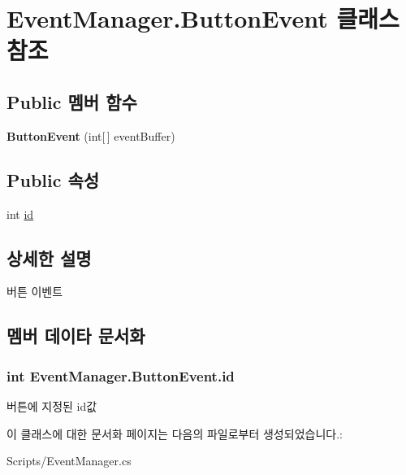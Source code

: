 \hypertarget{class_event_manager_1_1_button_event}{}\section{Event\+Manager.\+Button\+Event 클래스 참조}
\label{class_event_manager_1_1_button_event}
\subsection*{Public 멤버 함수}
\begin{DoxyCompactItemize}
\item 
\hypertarget{class_event_manager_1_1_button_event_a561644b31749f8f934620e88758335f6}{}{\bfseries Button\+Event} (int\mbox{[}$\,$\mbox{]} event\+Buffer)\label{class_event_manager_1_1_button_event_a561644b31749f8f934620e88758335f6}

\end{DoxyCompactItemize}
\subsection*{Public 속성}
\begin{DoxyCompactItemize}
\item 
int \hyperlink{class_event_manager_1_1_button_event_a1f2370e652753ea15df364cd3df7df2e}{id}
\end{DoxyCompactItemize}


\subsection{상세한 설명}
버튼 이벤트 

\subsection{멤버 데이타 문서화}
\hypertarget{class_event_manager_1_1_button_event_a1f2370e652753ea15df364cd3df7df2e}{}
\subsubsection[{id}]{\setlength{\rightskip}{0pt plus 5cm}int Event\+Manager.\+Button\+Event.\+id}\label{class_event_manager_1_1_button_event_a1f2370e652753ea15df364cd3df7df2e}
버튼에 지정된 id값 

이 클래스에 대한 문서화 페이지는 다음의 파일로부터 생성되었습니다.\+:\begin{DoxyCompactItemize}
\item 
Scripts/Event\+Manager.\+cs\end{DoxyCompactItemize}
